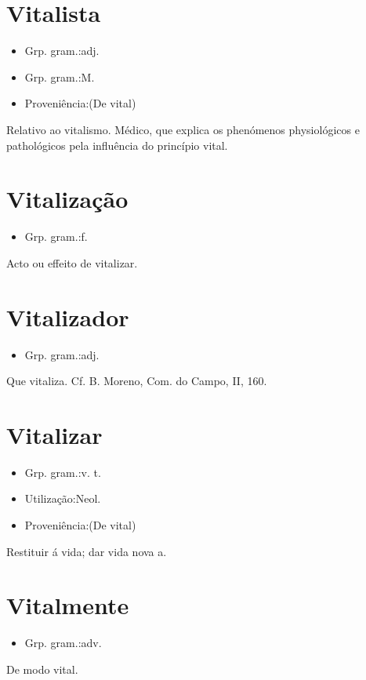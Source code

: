 \documentclass{article}
\begin{document}
\section{Vitalista}
\begin{itemize}
\item {Grp. gram.:adj.}
\end{itemize}
\begin{itemize}
\item {Grp. gram.:M.}
\end{itemize}
\begin{itemize}
\item {Proveniência:(De \textunderscore vital\textunderscore )}
\end{itemize}
Relativo ao vitalismo.
Médico, que explica os phenómenos physiológicos e pathológicos pela influência do princípio vital.
\section{Vitalização}
\begin{itemize}
\item {Grp. gram.:f.}
\end{itemize}
Acto ou effeito de vitalizar.
\section{Vitalizador}
\begin{itemize}
\item {Grp. gram.:adj.}
\end{itemize}
Que vitaliza. Cf. B. Moreno, \textunderscore Com. do Campo\textunderscore , II, 160.
\section{Vitalizar}
\begin{itemize}
\item {Grp. gram.:v. t.}
\end{itemize}
\begin{itemize}
\item {Utilização:Neol.}
\end{itemize}
\begin{itemize}
\item {Proveniência:(De \textunderscore vital\textunderscore )}
\end{itemize}
Restituir á vida; dar vida nova a.
\section{Vitalmente}
\begin{itemize}
\item {Grp. gram.:adv.}
\end{itemize}
De modo vital.
\end{document}

